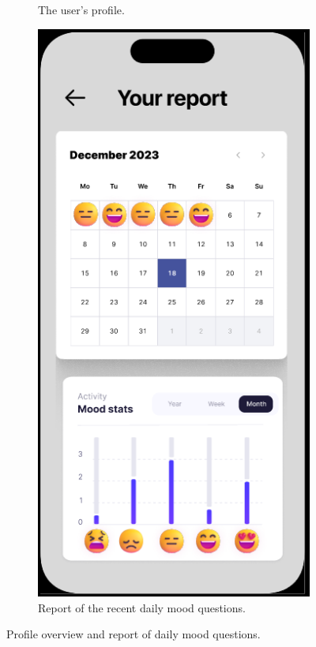 \documentclass[11pt]{article}
\begin{document}
\begin{figure}[h!]
\begin{subfigure}[b]{0.3\textwidth}
         \caption{The user's profile.\\ \mbox{} }
         \label{fig:profile}
     \end{subfigure}
        \hspace{1cm}
     \begin{subfigure}[b]{0.3\textwidth}
         \centering
         \includegraphics[width=\textwidth]{figures/report.PNG}
         \caption{Report of the recent daily mood questions.}
         \label{fig:report}
     \end{subfigure}
        \caption{Profile overview and report of daily mood questions.}
\end{figure}
\end{document}
